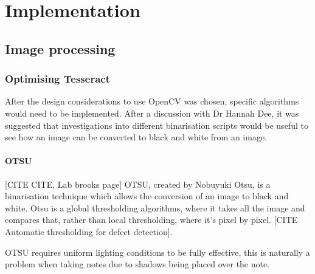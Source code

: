 \chapter{Implementation}




\section{Image processing}
\subsection{Optimising Tesseract}
After the design considerations to use OpenCV was chosen, specific algorithms would need to be implemented. After a discussion with Dr Hannah Dee, it was suggested that investigations into different binarisation scripts would be useful to see how an image can be converted to black and white from an image.

\subsubsection{OTSU}
[CITE CITE, Lab brooks page]
OTSU, created by Nobuyuki Otsu, is a binarisation technique which allows the conversion of an image to black and white. Otsu is a global thresholding algorithms, where it takes all the image and compares that, rather than local thresholding, where it's pixel by pixel. [CITE Automatic thresholding for defect detection].

OTSU requires uniform lighting conditions to be fully effective, this is naturally a problem when taking notes due to shadows being placed over the note.

